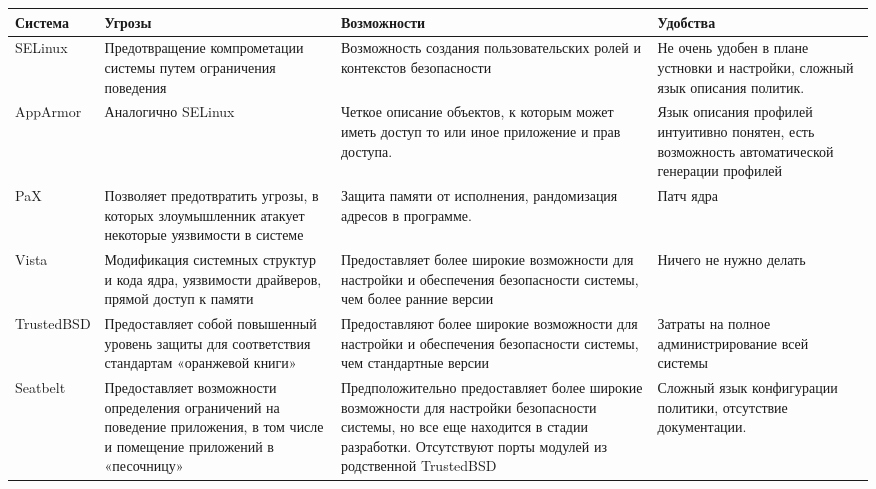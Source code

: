 \bigskip
\begin{tabular}{|p{2cm}|p{4cm}|p{4cm}|p{4cm}|}
\hline
Система & Угрозы & Возможности & Удобства \\
\hline
\ttfamily SELinux 
& 
Предотвращение компрометации системы путем ограничения поведения 
& 
Возможность создания пользовательских ролей и контекстов безопасности 
& 
Не очень удобен в плане устновки и настройки, сложный язык описания политик.\\
\hline 
\ttfamily AppArmor
&
Аналогично SELinux
&
Четкое описание объектов, к которым может иметь доступ то или иное приложение и прав доступа.
&
Язык описания профилей интуитивно понятен, есть возможность автоматической генерации профилей \\
\hline 
\ttfamily PaX
&
Позволяет предотвратить угрозы, в которых злоумышленник атакует некоторые уязвимости в системе
&
Защита памяти от исполнения, рандомизация адресов в программе.
&
Патч ядра \\ 
\hline 
\ttfamily Vista
& 
Модификация системных структур и кода ядра, уязвимости драйверов, прямой доступ к памяти
&
Предоставляет более широкие возможности для настройки и обеспечения безопасности системы, чем более ранние версии
&
Ничего не нужно делать\\
\hline
\ttfamily TrustedBSD
&
Предоставляет собой повышенный уровень защиты для соответствия стандартам «оранжевой книги»
&
Предоставляют более широкие возможности для настройки и обеспечения безопасности системы, чем стандартные версии 
&
Затраты на полное администрирование всей системы\\
\hline
\ttfamily Seatbelt
& 
Предоставляет возможности определения ограничений на поведение приложения, в том числе и помещение приложений в «песочницу»
&
Предположительно предоставляет более широкие возможности для настройки безопасности системы,  но все еще находится в стадии разработки. Отсутствуют порты модулей из родственной TrustedBSD
&
Сложный язык конфигурации политики, отсутствие документации. \\
\hline
\end{tabular}

\
